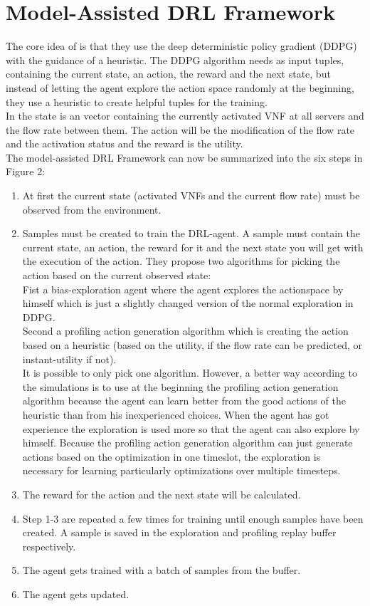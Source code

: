 \section{Model-Assisted DRL Framework}%
\label{sec:drl}
The core idea of \cite{Gu} is that they use the deep deterministic policy gradient (DDPG) with the guidance of a heuristic. The DDPG algorithm needs as input tuples, containing the current state, an action, the reward and the next state, but instead of letting the agent explore the action space randomly at the beginning, they use a heuristic to create helpful tuples for the training.\\
 In \cite{Gu} the state is an vector containing the currently activated VNF at all servers and the flow rate between them. The action will be the modification of the flow rate and the activation status and the reward is the utility.\\
The model-assisted DRL Framework can now be summarized into the six steps in Figure 2:%
\begin{enumerate}
\item At first the current state (activated VNFs and the current flow rate) must be observed from the environment.
\item Samples must be created to train the DRL-agent. A sample must contain the current state, an action, the reward for it and the next state you will get with the execution of the action. They propose two algorithms for picking the action based on the current observed state: \\
Fist a bias-exploration agent where the agent explores the actionspace by himself which is just a slightly changed version of the normal exploration in DDPG. \\
Second a profiling action generation algorithm which is creating the action based on a heuristic (based on the utility, if the flow rate can be predicted, or instant-utility if not). \\
It is possible to only pick one algorithm. However, a better way according to the simulations is to use at the beginning the profiling action generation algorithm because the agent can learn better from the good actions of the heuristic than from his inexperienced choices. When the agent has got experience the exploration is used more so that the agent can also explore by himself. Because the profiling action generation algorithm can just generate actions based on the optimization in one timeslot, the exploration is necessary for learning  particularly optimizations over multiple timesteps.
\item  The reward for the action and the next state will be calculated.
\item Step 1-3 are repeated a few times for training until enough samples have been created. A sample is saved in the exploration and profiling replay buffer respectively.
\item The agent gets trained with a batch of samples from the buffer.
\item The agent gets updated.
\end{enumerate}

